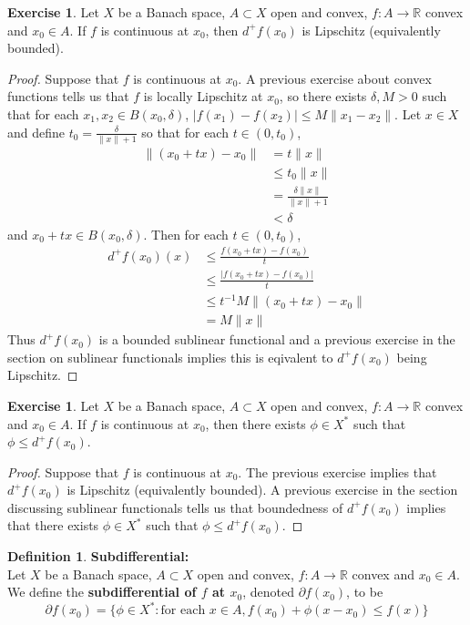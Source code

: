 \documentclass[12pt]{amsart}
\theoremstyle{definition}
\newtheorem{defn}[definition]{Definition}
\newtheorem{ex}[definition]{Exercise}
\newcommand{\del}{\delta}
\newcommand{\R}{\mathbb{R}}
\newcommand{\p}{\partial}
\begin{document}
	\begin{ex}
	Let $X$ be a Banach space, $A \subset X$ open and convex, $f:A \rightarrow \R$ convex and $x_0 \in A$. If $f$ is continuous at $x_0$, then $d^+f(x_0)$ is Lipschitz (equivalently bounded). 
	\end{ex}	
	
	\begin{proof}
	Suppose that $f$ is continuous at $x_0$. A previous exercise about convex functions tells us that $f$ is locally Lipschitz at $x_0$, so there exists $\del,M >0$ such that for each $x_1, x_2 \in B(x_0, \del)$, $|f(x_1) - f(x_2)| \leq M\|x_1 - x_2\|$. Let $x \in X$ and define $t_0 = \frac{\del}{\|x\| + 1}$ so that for each $t \in (0, t_0)$,
	\begin{align*}
	\|(x_0 +tx) - x_0\|
	& = t\|x\| \\
	& \leq t_0 \| x\| \\
	&= \frac{\del \| x\|}{\|x\| + 1} \\
	& < \del
	\end{align*}  
	and $x_0 +tx \in B(x_0, \del)$.
	Then for each $t \in (0, t_0)$, 
	\begin{align*}
	d^+f(x_0)(x) 
	& \leq \frac{f(x_0 + tx) - f(x_0)}{t} \\
	& \leq \frac{|f(x_0 + tx) - f(x_0)|}{t} \\
	& \leq t^{-1}M \| (x_0 + tx) - x_0\| \\
	&= M\|x\|
	\end{align*}
	Thus $d^+f(x_0)$ is a bounded sublinear functional and  a previous exercise in the section on sublinear functionals implies this is eqivalent to $d^+f(x_0)$ being Lipschitz.
	\end{proof}
	
	\begin{ex}
	Let $X$ be a Banach space, $A \subset X$ open and convex, $f:A \rightarrow \R$ convex and $x_0 \in A$. If $f$ is continuous at $x_0$, then there exists $\phi \in X^*$ such that $\phi \leq d^+f(x_0)$.
	\end{ex}	
	
	\begin{proof}
	Suppose that $f$ is continuous at $x_0$. The previous exercise implies that $d^+f(x_0)$ is Lipschitz (equivalently bounded). A previous exercise in the section discussing sublinear functionals tells us that boundedness of $d^+f(x_0)$ implies that there exists $\phi \in X^*$ such that $\phi \leq d^+f(x_0)$.
	\end{proof}
	
	\begin{defn}\textbf{Subdifferential:}\\
	Let $X$ be a Banach space, $A \subset X$ open and convex, $f:A \rightarrow \R$ convex and $x_0 \in A$. We define the \textbf{subdifferential of $f$ at $x_0$}, denoted $\p f(x_0)$, to be $$\p f(x_0) = \{ \phi \in X^*: \text{for each } x \in A, f(x_0) + \phi(x-x_0) \leq f(x)\}$$
	\end{defn}
	
\end{document}
